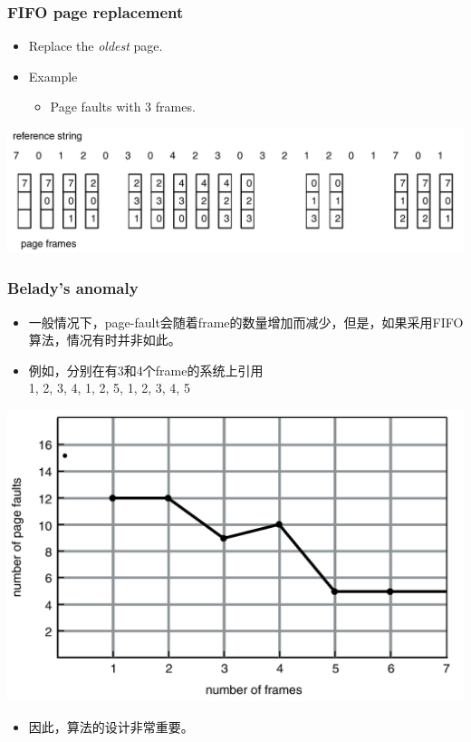 \documentclass[CJKutf8,xcolor=pdftex,dvipsnames,table]{beamer}
\begin{document}
\begin{CJK*}{UTF8}{song}
  \begin{frame}
    \frametitle{FIFO page replacement} \pause
    \begin{itemize}
    \item{Replace the \emph{oldest} page.} \pause
    \item{Example} \pause
      \begin{itemize}
      \item{Page faults with 3 frames.} \pause
      \end{itemize}
    \end{itemize}
    \begin{center}
      \includegraphics[scale=.4]{v6f10-9}
    \end{center}
  \end{frame}
  
  \begin{frame}
    \frametitle{Belady's anomaly} \pause
    \begin{itemize}\parskip=0pt
    \item{一般情况下，page-fault会随着frame的数量增加而减少，但是，如果采用FIFO算法，情况有时并非如此。} \pause
    \item{例如，分别在有3和4个frame的系统上引用\\ 1, 2, 3, 4, 1, 2, 5, 1, 2, 3, 4, 5} \pause
    \end{itemize}
    \begin{center}
      \includegraphics[scale=0.2]{v6f10-10} \pause
    \end{center}
    \begin{itemize}
    \item{因此，算法的设计非常重要。}
    \end{itemize}
  \end{frame}
  

\end{CJK*}
\end{document}

